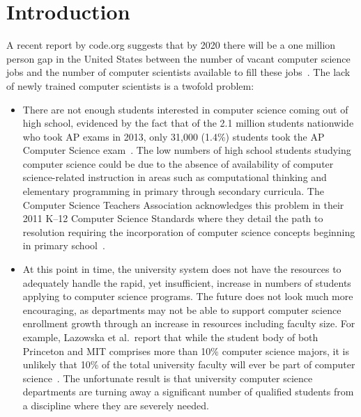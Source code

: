 \chapter{Introduction} \label{chap:introduction}
A recent report by code.org suggests that by 2020 there will be a one million
person gap in the United States between the number of vacant computer science
jobs and the number of computer scientists available to fill these
jobs~\cite{codeorg:2013}. The lack of newly trained computer scientists is a
twofold problem:

\begin{itemize}
\item There are not enough students interested in computer science coming out
  of high school, evidenced by the fact that of the 2.1 million students
  nationwide who took AP exams in 2013, only 31,000 (1.4\%) students took the
  AP Computer Science exam~\cite{cb:2013}. The low numbers of high school
  students studying computer science could be due to the absence of
  availability of computer science-related instruction in areas such as
  computational thinking and elementary programming in primary through
  secondary curricula. The Computer Science Teachers Association acknowledges
  this problem in their 2011 K--12 Computer Science Standards where they detail
  the path to resolution requiring the incorporation of computer science
  concepts beginning in primary school~\cite{cstastandards}.
\item At this point in time, the university system does not have the resources
  to adequately handle the rapid, yet insufficient, increase in numbers of
  students applying to computer science programs. The future does not look much
  more encouraging, as departments may not be able to support computer science
  enrollment growth through an increase in resources including faculty
  size. For example, Lazowska et al.\ report that while the student body of
  both Princeton and MIT comprises more than 10\% computer science majors, it
  is unlikely that 10\% of the total university faculty will ever be part of
  computer science~\cite{lazowska:2014}. The unfortunate result is that
  university computer science departments are turning away a significant number
  of qualified students from a discipline where they are severely needed.
\end{itemize}


